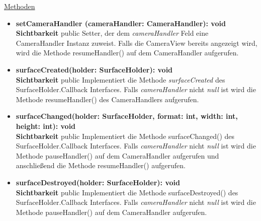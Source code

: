 \underline{Methoden}
\begin{itemize}
\itemsep0pt

\item \textbf{setCameraHandler (cameraHandler: CameraHandler): void}\hfill\\
\textbf{Sichtbarkeit} public\newline
Setter, der dem \textit{cameraHandler} Feld eine CameraHandler Instanz zuweist. Falls die CameraView bereits angezeigt wird, wird die Methode resumeHandler() auf dem CameraHandler aufgerufen.

\item \textbf{surfaceCreated(holder: SurfaceHolder): void}\hfill\\
\textbf{Sichtbarkeit} public\newline
Implementiert die Methode \textit{surfaceCreated} des SurfaceHolder.Callback Interfaces. Falls \textit{cameraHandler} nicht \textit{null} ist wird die Methode resumeHandler() des CameraHandlers aufgerufen.

\item \textbf{surfaceChanged(holder: SurfaceHolder, format: int, width: int, height: int): void}\hfill\\
\textbf{Sichtbarkeit} public\newline
Implementiert die Methode surfaceChanged() des SurfaceHolder.Callback Interfaces. Falls \textit{cameraHandler} nicht \textit{null} ist wird die Methode pauseHandler() auf dem CameraHandler aufgerufen und anschließend die Methode resumeHandler() aufgerufen.

\item \textbf{surfaceDestroyed(holder: SurfaceHolder): void}\hfill\\
\textbf{Sichtbarkeit} public\newline
Implementiert die Methode surfaceDestroyed() des SurfaceHolder.Callback Interfaces. Falls \textit{cameraHandler} nicht \textit{null} ist wird die Methode pauseHandler() auf dem CameraHandler aufgerufen.

\end{itemize}